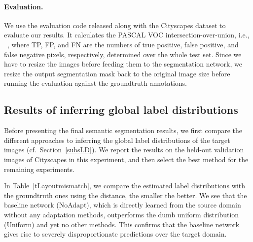 \paragraph{Evaluation.} We use the evaluation code released along with the Cityscapes dataset to evaluate our results. It calculates the PASCAL VOC intersection-over-union, i.e., 
~\cite{everingham_pascal_2015}, where  TP, FP, and FN are the numbers of true positive, false positive, and false
negative pixels, respectively, determined over the whole test set. Since we have to resize the images before feeding them to the segmentation network, we resize the output segmentation mask back to the original image size before running the evaluation against the groundtruth annotations.









\begin{table}
\centering
\caption{The  distances between the groundtruth label distributions and those predicted by different methods.}
\label{tLayoutmismatch}
\vspace{-15pt}
\end{table}

\subsection{Results of inferring global label distributions}
Before presenting the final semantic segmentation results, we first compare the different approaches to inferring the global label distributions of the target images (cf.\ Section~\ref{subsLD}). We report the results on the held-out validation images of Cityscapes in this experiment, and then select the best method for the remaining experiments. 

In Table~\ref{tLayoutmismatch}, we compare the estimated label distributions with the groundtruth ones using the  distance, the smaller the better. We see that the baseline network (NoAdapt), which is directly learned from the source domain without any adaptation methods, outperforms the dumb uniform distribution (Uniform) and yet no other methods. This confirms that the baseline network gives rise to severely disproportionate predictions over the target domain. 


